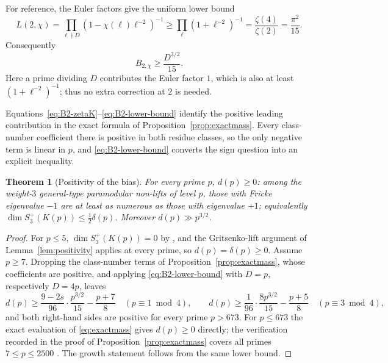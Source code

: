 \documentclass[10pt,a4paper]{amsart}
\newtheorem{theorem}{Theorem}[section]
\begin{document}
	For reference, the Euler factors give the uniform lower bound
	\begin{equation}\label{eq:L2-lower-bound}
		L(2,\chi)
		=\prod_{\ell\nmid D}(1-\chi(\ell)\ell^{-2})^{-1}
		\geq\prod_{\ell}(1+\ell^{-2})^{-1}
		=\frac{\zeta(4)}{\zeta(2)}=\frac{\pi^2}{15}.
	\end{equation}
	Consequently
	\begin{equation}\label{eq:B2-lower-bound}
		B_{2,\chi}\geq\frac{D^{3/2}}{15}.
	\end{equation}
	Here a prime dividing $D$ contributes the Euler factor $1$, which is also at
	least $(1+\ell^{-2})^{-1}$; thus no extra correction at $2$ is needed.
	
	Equations~\eqref{eq:B2-zetaK}--\eqref{eq:B2-lower-bound} identify the
	positive leading contribution in the exact formula of
	Proposition~\ref{prop:exactmass}.  Every class-number coefficient
	there is positive in both residue classes, so the only negative term is
	linear in $p$, and \eqref{eq:B2-lower-bound} converts the sign question
	into an explicit inequality.
	
	\begin{theorem}[Positivity of the bias]\label{thm:bias}
		For every prime $p$, $d(p)\ge0$: among the weight-$3$ general-type
		paramodular non-lifts of level $p$, those with Fricke eigenvalue $-1$
		are at least as numerous as those with eigenvalue $+1$; equivalently
		$\dim S_3^+(K(p))\le\tfrac12\delta(p)$. Moreover $d(p)\gg p^{3/2}$.
	\end{theorem}
	
	\begin{proof}
		For $p\le5$, $\dim S_3^{+}(K(p))=0$ by \cite[Prop.~8.2]{Ibukiyama-dim},
		and the Gritsenko-lift argument of Lemma~\ref{lem:positivity} applies at
		every prime, so $d(p)=\delta(p)\ge0$. Assume $p\ge7$.
		Dropping the class-number terms of Proposition~\ref{prop:exactmass},
		whose coefficients are positive, and applying \eqref{eq:B2-lower-bound}
		with $D=p$, respectively $D=4p$, leaves
		\[
		d(p)\ge\frac{9-2s}{96}\cdot\frac{p^{3/2}}{15}-\frac{p+7}{8}
		\quad(p\equiv1\bmod4),
		\qquad
		d(p)\ge\frac{1}{96}\cdot\frac{8p^{3/2}}{15}-\frac{p+5}{8}
		\quad(p\equiv3\bmod4),
		\]
		and both right-hand sides are positive for every prime $p>673$. For
		$p\le673$ the exact evaluation of \eqref{eq:exactmass} gives
		$d(p)\ge0$ directly; the verification recorded in the proof of
		Proposition~\ref{prop:exactmass} covers all primes $7\le p\le2500$
		\cite{artifact}. The growth statement follows from the same lower
		bound.
	\end{proof}
	
\end{document}
